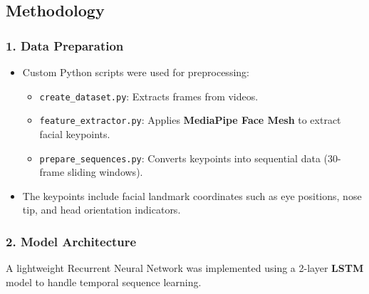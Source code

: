 \documentclass[
  letterpaper,
  DIV=11,
  numbers=noendperiod]{scrreport}
\providecommand{\tightlist}{%
  \setlength{\itemsep}{0pt}\setlength{\parskip}{0pt}}
\begin{document}
\subsection{Methodology}\label{methodology-1}

\subsubsection{1. Data Preparation}\label{data-preparation}

\begin{itemize}
\tightlist
\item
  Custom Python scripts were used for preprocessing:

  \begin{itemize}
  \tightlist
  \item
    \texttt{create\_dataset.py}: Extracts frames from videos.
  \item
    \texttt{feature\_extractor.py}: Applies \textbf{MediaPipe Face Mesh}
    to extract facial keypoints.
  \item
    \texttt{prepare\_sequences.py}: Converts keypoints into sequential
    data (30-frame sliding windows).
  \end{itemize}
\item
  The keypoints include facial landmark coordinates such as eye
  positions, nose tip, and head orientation indicators.
\end{itemize}

\subsubsection{2. Model Architecture}\label{model-architecture-1}

A lightweight Recurrent Neural Network was implemented using a 2-layer
\textbf{LSTM} model to handle temporal sequence learning.
\end{document}
